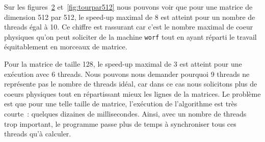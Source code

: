 Sur les figures~\ref{fig:homopar512} et~\ref{fig:tourpar512} nous
pouvons voir que pour une matrice de dimension 512 par 512, le speed-up
maximal de 8 est atteint pour un nombre de threads égal à 10. Ce
chiffre est rassurant car c'est le nombre maximal de coeur physiques qu'on peut
soliciter de la machine \texttt{worf} tout en ayant réparti le travail
équitablement en morceaux de matrice.
\medskip

Pour la matrice de taille 128, le speed-up maximal de 3 est atteint
pour une exécution avec 6 threads. Nous pouvons nous demander pourquoi
9 threads ne représente pas le nombre de threads idéal, car dans ce
cas nous solicitons plus de coeurs physiques tout en répartissant
mieux les lignes de la matrices. Le problème est que pour une telle
taille de matrice, l'exécution de l'algorithme est très courte~:
quelques dizaines de millisecondes. Ainsi, avec un nombre de threads
trop important, le programme passe plus de temps à synchroniser tous
ces threads qu'à calculer.
\medskip

\begin{figure}[!ht]
  \caption{}
  \label{fig:homopar128}
\end{figure}

\begin{figure}[!ht]
  \caption{}
  \label{fig:homopar512}
\end{figure}

